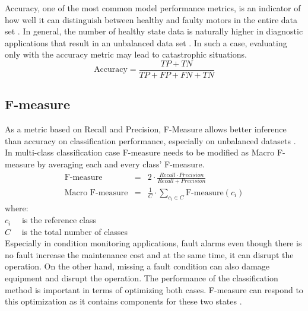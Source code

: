Accuracy, one of the most common model performance metrics, is an indicator of how well it can distinguish between healthy and faulty motors in the entire data set \cite{grandini2020metrics}. In general, the number of healthy state data is naturally higher in diagnostic applications that result in an unbalanced data set \cite{han2021deep}. In such a case, evaluating only with the accuracy metric may lead to catastrophic situations. 
\begin{equation}
\text{Accuracy} = \displaystyle\frac{TP + TN}{TP + FP + FN + TN} 
\label{accuracy}	
\end{equation}
\subsection{F-measure}
As a metric based on Recall and Precision, F-Measure allows better inference than accuracy on classification performance, especially on unbalanced datasets \cite{he2009learning}. In multi-class classification case F-measure needs to be modified as Macro F-measure by averaging each and every class' F-measure.
\begin{eqnarray}
\text{F-measure} &=& 2\cdot\displaystyle\frac{Recall\cdot Precision}{Recall + Precision}\\
\text{Macro F-measure} &=& \displaystyle\frac{1}{C}\cdot \displaystyle\sum_{c_{i} \in C}\text{F-measure}({c_i})
\label{fmeas}	
\end{eqnarray}
where:\\
$c_{i} \quad$ is the reference class \\
$C \quad$ is the total number of classes\\
Especially in condition monitoring applications, fault alarms even though there is no fault increase the maintenance cost and at the same time, it can disrupt the operation. On the other hand, missing a fault condition can also damage equipment and disrupt the operation. The performance of the classification method is important in terms of optimizing both cases. F-measure can respond to this optimization as it contains components for these two states \cite{janssens2016convolutional,seliya2009study}.
